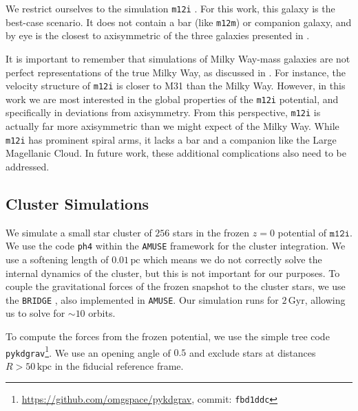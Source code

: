 \documentclass[twocolumn]{aastex62}
\newcommand{\pc}{\text{pc}}
\newcommand{\kpc}{\text{kpc}}
\newcommand{\Gyr}{\text{Gyr}}
\newcommand{\z}{z}
\begin{document}
We restrict ourselves to the simulation \texttt{m12i} \citep[first introduced
in][]{2016ApJ...827L..23W}. For this work, this galaxy is the best-case
scenario. It does not contain a bar (like \texttt{m12m}) or companion galaxy,
and by eye is the closest to axisymmetric of the three galaxies presented in
\citet{2018arXiv180610564S} \citep{2018MNRAS.481.4133G}.

It is important to remember that simulations of Milky Way-mass galaxies are
not perfect representations of the true Milky Way, as discussed in
\citet{2018arXiv180610564S}. For instance, the velocity structure of
\texttt{m12i} is closer to M31 than the Milky Way. However, in this work we
are most interested in the global properties of the \texttt{m12i} potential,
and specifically in deviations from axisymmetry. From this perspective,
\texttt{m12i} is actually far more axisymmetric than we might expect of the
Milky Way. While \texttt{m12i} has prominent spiral arms, it lacks a bar and
a companion like the Large Magellanic Cloud. In future work, these additional
complications also need to be addressed.

\subsection{Cluster Simulations} \label{ssec:cluster_sim}
We simulate a small star cluster of $256$ stars in the frozen $\z=0$
potential of $\texttt{m12i}$. We use the code \texttt{ph4} within the
\texttt{AMUSE} framework \citep{2011ascl.soft07007P, 2013CoPhC.184..456P,
2013A&A...557A..84P} for the cluster integration. We use a softening length
of $0.01\,\pc$ which means we do not correctly solve the internal dynamics of
the cluster, but this is not important for our purposes. To couple the
gravitational forces of the frozen snapshot to the cluster stars, we use the
\texttt{BRIDGE} \citep{2007PASJ...59.1095F}, also implemented in
\texttt{AMUSE}. Our simulation runs for $2\,\Gyr$, allowing us to solve for
$\sim 10$ orbits.

To compute the forces from the frozen potential, we use the simple tree code
\texttt{pykdgrav}\footnote{\url{https://github.com/omgspace/pykdgrav},
commit: \texttt{fbd1ddc}}. We use an opening angle of $0.5$ and exclude stars
at distances $R>50\,\kpc$ in the fiducial reference frame.
\end{document}
